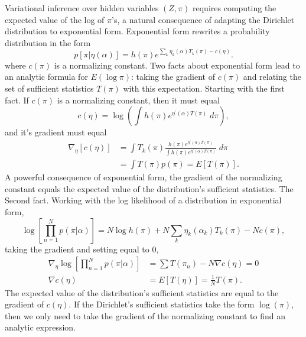 \documentclass[12pt]{article}
\def\l{\left}
\def\r{\right}
\newcommand{\f}{\frac}
\begin{document}
Variational inference over hidden variables $(Z,\pi)$ requires computing the expected value of the log of $\pi$'s, a natural consequence of adapting the Dirichlet distribution to exponential form.
Exponential form rewrites a probability distribution in the form
\begin{equation}
  p\l[\pi|\eta(\alpha)\r] = h(\pi)e^{ \sum_{k} \eta_{k}(\alpha) T_{k}(\pi) - c(\eta)}.
\end{equation}
where $c(\pi)$ is a normalizing constant.
Two facts about exponential form lead to an analytic formula for $E(\log \pi)$: taking the gradient of $c(\pi)$ and relating the set of sufficient statistics $T(\pi)$ with this expectation.
Starting with the first fact.
If $c(\pi)$ is a normalizing constant, then it must equal
\begin{equation}
  c(\eta) = \log \l( \int  h(\pi)e^{ \eta^{'}(\alpha)T(\pi)} \; d \pi  \r),
\end{equation}
and it's gradient must equal
\begin{align}
   \nabla_{\eta} \l[c(\eta)\r] &= \int T_{k}(\pi) \f{h(\pi)e^{ \eta^{'}(\alpha)T(\pi)}}{\int  h(\pi)e^{ \eta^{'}(\alpha)T(\pi) }} \; d \pi\\
                &= \int T(\pi) p(\pi) = E[T(\pi)] .
\end{align}
A powerful consequence of exponential form, the gradient of the normalizing constant equals the expected value of the distribution's sufficient statistics.
The Second fact.
Working with the log likelihood of a distribution in exponential form, 
\begin{equation}
  \log \l[ \prod_{n=1}^{N} p(\pi|\alpha)\r] = N \log h(\pi) +  N \sum_{k} \eta_{k}(\alpha_{k})T_{k}(\pi) - N c(\pi),
\end{equation}
taking the gradient and setting equal to 0,
\begin{align}
  \nabla_{\eta} \log \l[ \prod_{n=1}^{N} p(\pi|\alpha)\r] &=  \sum T(\pi_{n}) - N \nabla c(\eta) = 0\\
  \nabla c(\eta) &= E\l[ T(\eta) \r] = \f{1}{N} T(\pi).
\end{align}
The expected value of the distribution's sufficient statistics are equal to the gradient of $c(\eta)$.
If the Dirichlet's sufficient statistics take the form $\log(\pi)$, then we only need to take the gradient of the normalizing constant to find an analytic expression.
\end{document}
